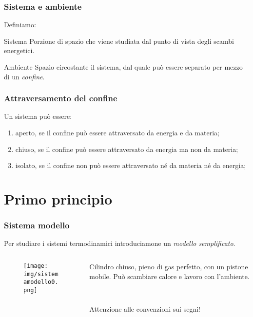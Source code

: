 \documentclass[]{beamer}
\theoremstyle{plain}
\begin{document}
\begin{frame}
\frametitle{Sistema e ambiente}
Definiamo:
\begin{block}{Sistema}
Porzione di spazio che viene studiata dal punto di vista degli scambi energetici.
\end{block}\pause
\begin{block}{Ambiente}
Spazio circostante il sistema, dal quale può essere separato per mezzo di un \emph{confine}.
\end{block}
\end{frame}

\begin{frame}
\frametitle{Attraversamento del confine}
Un sistema può essere:
\begin{enumerate}
  \item \alert<1>{aperto}, se il confine può essere attraversato da energia e da materia;\pause
  \item \alert<2>{chiuso}, se il confine può essere attraversato da energia ma non da materia;\pause
  \item \alert<3>{isolato}, se il confine non può essere attraversato né da materia né da energia;
\end{enumerate}
\end{frame}



\section{Primo principio}

\begin{frame}
\frametitle{Sistema modello}
Per studiare i sistemi termodinamici introduciamone un \emph{modello semplificato}.

\begin{columns}
\begin{column}{0.5\textwidth}
\begin{figure}
\texttt{[image: img/sistemamodello0.png]}
\end{figure}
\end{column}
\begin{column}{0.4\textwidth}
Cilindro chiuso, pieno di gas perfetto, con un pistone mobile. \alert<1>{Può scambiare calore e lavoro con l'ambiente}.\pause

~

\alert<2>{Attenzione alle convenzioni sui segni!}
\end{column}
\end{columns}
\end{frame}
\end{document}
